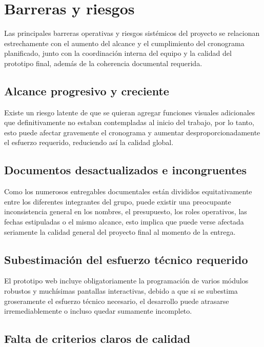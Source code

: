\documentclass[11pt,spanish]{article}
\begin{document}
\section{Barreras y riesgos}

Las principales barreras operativas y riesgos sistémicos del proyecto se relacionan estrechamente con el aumento del alcance y el cumplimiento del cronograma planificado, junto con la coordinación interna del equipo y la calidad del prototipo final, además de la coherencia documental requerida.

\subsection{Alcance progresivo y creciente}

Existe un riesgo latente de que se quieran agregar funciones visuales adicionales que definitivamente no estaban contempladas al inicio del trabajo, por lo tanto, esto puede afectar gravemente el cronograma y aumentar desproporcionadamente el esfuerzo requerido, reduciendo así la calidad global.

\subsection{Documentos desactualizados e incongruentes}

Como los numerosos entregables documentales están divididos equitativamente entre los diferentes integrantes del grupo, puede existir una preocupante inconsistencia general en los nombres, el presupuesto, los roles operativos, las fechas estipuladas o el mismo alcance, esto implica que puede verse afectada seriamente la calidad general del proyecto final al momento de la entrega.

\subsection{Subestimación del esfuerzo técnico requerido}

El prototipo web incluye obligatoriamente la programación de varios módulos robustos y muchísimas pantallas interactivas, debido a que si se subestima groseramente el esfuerzo técnico necesario, el desarrollo puede atrasarse irremediablemente o incluso quedar sumamente incompleto.

\subsection{Falta de criterios claros de calidad}
\end{document}
